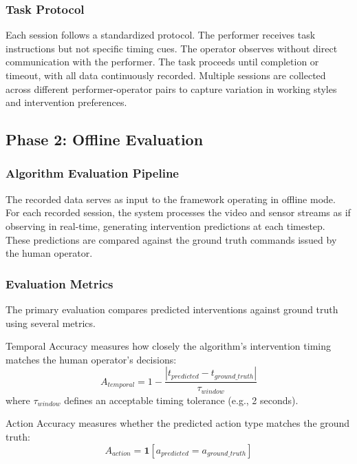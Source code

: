 \documentclass[11pt, a4paper]{article}
\begin{document}
\subsubsection{Task Protocol}

Each session follows a standardized protocol. The performer receives task instructions but not specific timing cues. The operator observes without direct communication with the performer. The task proceeds until completion or timeout, with all data continuously recorded. Multiple sessions are collected across different performer-operator pairs to capture variation in working styles and intervention preferences.

\subsection{Phase 2: Offline Evaluation}

\subsubsection{Algorithm Evaluation Pipeline}

The recorded data serves as input to the framework operating in offline mode. For each recorded session, the system processes the video and sensor streams as if observing in real-time, generating intervention predictions at each timestep. These predictions are compared against the ground truth commands issued by the human operator.

\subsubsection{Evaluation Metrics}

The primary evaluation compares predicted interventions against ground truth using several metrics.

Temporal Accuracy measures how closely the algorithm's intervention timing matches the human operator's decisions:
\begin{equation}
    A_{temporal} = 1 - \frac{|t_{predicted} - t_{ground\_truth}|}{\tau_{window}}
\end{equation}
where $\tau_{window}$ defines an acceptable timing tolerance (e.g., 2 seconds).

Action Accuracy measures whether the predicted action type matches the ground truth:
\begin{equation}
    A_{action} = \mathbf{1}[a_{predicted} = a_{ground\_truth}]
\end{equation}
\end{document}
